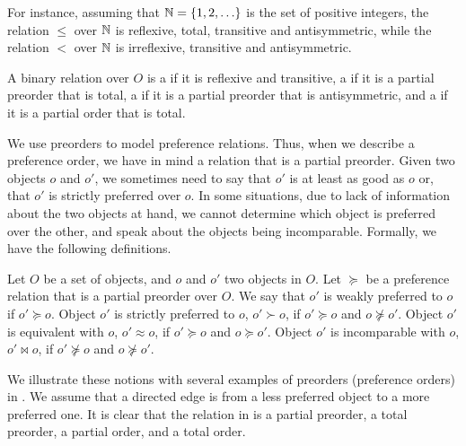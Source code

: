 For instance, assuming that $\mathbb{N}=\{1,2,\ldots\}$ is the set of positive integers,
the  relation $\leq$ over $\mathbb{N}$ is reflexive,
total, transitive and antisymmetric, while the  relation
$<$ over $\mathbb{N}$ is irreflexive, transitive and antisymmetric.


\begin{definition}
\label{def:orders}
	A binary relation over $O$ is a  if it is reflexive and transitive,
	a  if it is a partial preorder that is total,
	a  if it is a partial preorder that is antisymmetric,
	and a  if it is a partial order that is total.
\end{definition}

We use preorders to model preference relations.
Thus, when we describe a preference order, we have in mind a relation
that is a partial preorder.
Given two objects $o$ and $o'$,
we sometimes need to say that $o'$ is at least as good as $o$ or,
that $o'$ is strictly preferred over $o$.
In some situations, due to 
lack of information about the two objects at hand, we
cannot determine which object is preferred over the other, and
speak about the objects being incomparable.
Formally, we have the following definitions.
\begin{definition}
	Let $O$ be a set of objects, and $o$ and $o'$ two objects in $O$.
	Let $\succeq$ be a preference relation that is a partial preorder	over $O$.
	We say that $o'$ is weakly preferred to $o$ if $o' \succeq o$.
	Object $o'$ is strictly preferred to $o$, $o' \succ o$, if $o' \succeq o$ and $o \not \succeq o'$.
	Object $o'$ is equivalent with $o$, $o' \approx o$, if $o' \succeq o$ and $o \succeq o'$.
	Object $o'$ is incomparable with $o$, $o' \bowtie o$, if $o' \not \succeq o$ and $o \not \succeq o'$.
\end{definition}

We illustrate these notions with several examples of preorders (preference orders)
in .
We assume that a directed edge is from a less preferred object to
a more preferred one.
It is clear that the relation in  is a partial 
preorder,  a total preorder,  a partial
order, and  a total order.


